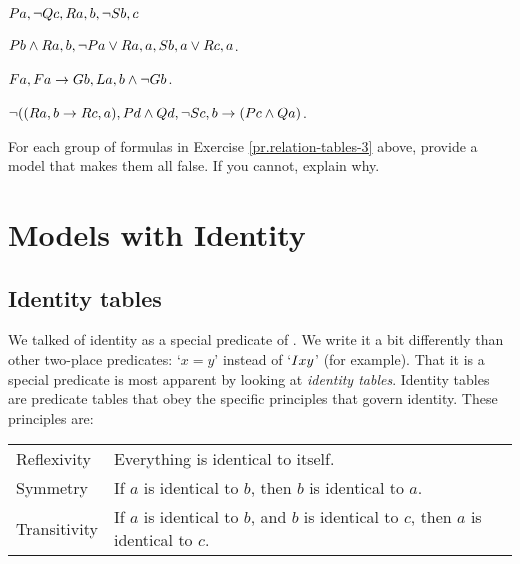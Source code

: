 \documentclass[PHIL101-Textbook.tex]{subfiles}
\begin{document}
\begin{earg}
\item $\mathord{P}{a}, \neg \mathord{Q}{c}, \mathord{R}{a,b}, \neg \mathord{S}{b,c}$
\item $\mathord{P}{b} \land \mathord{R}{a,b}, \neg \mathord{P}{a} \vee \mathord{R}{a,a}, \mathord{S}{b,a} \vee \mathord{R}{c,a}$.
\item $\mathord{F}{a}, \mathord{F}{a} \rightarrow \mathord{G}{b}, \mathord{L}{a,b} \land \neg \mathord{G}{b}$.
\item $\neg((\mathord{R}{a,b}\rightarrow \mathord{R}{c,a}), \mathord{P}{d} \land \mathord{Q}{d}, \neg \mathord{S}{c,b} \rightarrow (\mathord{P}{c} \land \mathord{Q}{a})$.
\end{earg}

\noindent \problempart
\label{pr.relation-tables-4}
For each group of formulas in Exercise \ref{pr.relation-tables-3} above, provide a model that makes them all false. If you cannot, explain why. 





\chapter{Models with Identity}
\label{ch:models.identity}

\section{Identity tables}

We talked of identity as a special predicate of \pl. We write it a bit differently than other two-place predicates: `$x=y$' instead of `$\mathord{I}{xy}$' (for example). That it is a special predicate is most apparent by looking at \emph{identity tables}. Identity tables are predicate tables that obey the specific principles that govern identity. These principles are:

\begin{center}
  \begin{tabular}{@{}lp{10cm}@{}}
	Reflexivity& Everything is identical to itself.\\
	Symmetry & If $a$ is identical to $b$, then $b$ is identical to $a$.\\
	Transitivity & If $a$ is identical to $b$, and $b$ is identical to $c$, then $a$ is identical to $c$.
  \end{tabular}
\end{center}
\end{document}
